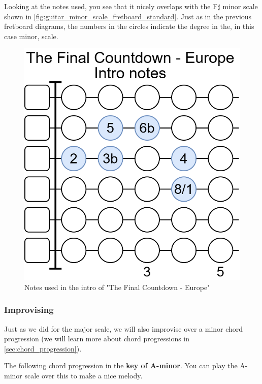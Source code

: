 Looking at the notes used, you see that it nicely overlaps with the F$\sharp$ minor scale shown in \autoref{fig:guitar_minor_scale_fretboard_standard}. Just as in the previous fretboard diagrams, the numbers in the circles indicate the degree in the, in this case minor, scale.

\begin{figure}[h]
	\centering
	\includegraphics[height=0.2\textheight]{../../Images/NotesUsedInTheFinalCountdownEuropeIntro.png}
	\caption{Notes used in the intro of "The Final Countdown - Europe"}
	\label{fig:guitar_the_final_countdown_europe_fretboard_minor_scale}
\end{figure}

\newpage

\subsubsection{Improvising}

Just as we did for the major scale, we will also improvise over a minor chord progression (we will learn more about chord progressions in \autoref{sec:chord_progression}).

The following chord progression in the \textbf{key of A-minor}. You can play the A-minor scale over this to make a nice melody.

